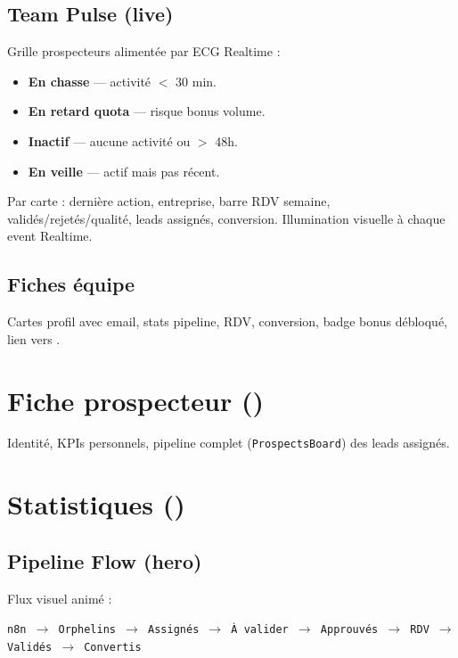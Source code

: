 \documentclass[11pt,a4paper]{report}
\begin{document}
\subsection{Team Pulse (live)}

Grille prospecteurs alimentée par ECG Realtime :
\begin{itemize}[noitemsep]
  \item \textbf{En chasse} --- activité $<$ 30 min.
  \item \textbf{En retard quota} --- risque bonus volume.
  \item \textbf{Inactif} --- aucune activité ou $>$ 48h.
  \item \textbf{En veille} --- actif mais pas récent.
\end{itemize}

Par carte : dernière action, entreprise, barre RDV semaine, validés/rejetés/qualité, leads assignés, conversion. Illumination visuelle à chaque event Realtime.

\subsection{Fiches équipe}

Cartes profil avec email, stats pipeline, RDV, conversion, badge bonus débloqué, lien vers .

\section{Fiche prospecteur ()}

Identité, KPIs personnels, pipeline complet (\texttt{ProspectsBoard}) des leads assignés.

\section{Statistiques ()}

\subsection{Pipeline Flow (hero)}

Flux visuel animé :
\begin{center}
\texttt{n8n $\rightarrow$ Orphelins $\rightarrow$ Assignés $\rightarrow$ À valider $\rightarrow$ Approuvés $\rightarrow$ RDV $\rightarrow$ Validés $\rightarrow$ Convertis}
\end{center}
\end{document}
